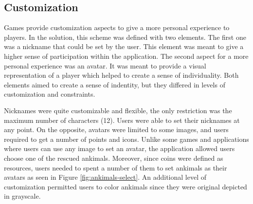 \subsection{Customization}
Games provide customization aspects to give a more personal experience to players. In the solution, this scheme was defined with two elements. The first one was a nickname that could be set by the user. This element was meant to give a higher sense of participation within the application. The second aspect for a more personal experience was an avatar. It was meant to provide a visual representation of a player which helped to create a sense of individuality. Both elements aimed to create a sense of indentity, but they differed in levels of customization and constraints.

Nicknames were quite customizable and flexible, the only restriction was the maximum number of characters (12). Users were able to set their nicknames at any point. On the opposite, avatars were limited to some images, and users required to get a number of points and icons. Unlike some games and applications where users can use any image to set an avatar, the application allowed users choose one of the rescued ankimals. Moreover, since coins were defined as resources, users needed to spent a number of them to set ankimals as their avatars as seen in Figure \ref{fig:ankimals-select}. An additional level of customization permitted users to color ankimals since they were original depicted in grayscale.

